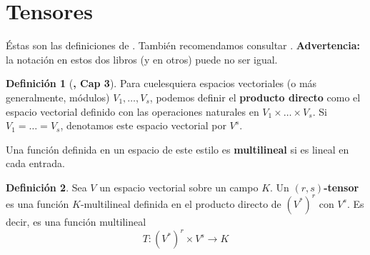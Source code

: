 \documentclass[spanish]{book}
\theoremstyle{definition}
\newtheorem*{defn}{Definición}
\begin{document}
	\section{Tensores}
	Éstas son las definiciones de \cite{ONeill}. También recomendamos consultar \cite{Palmas}. \textbf{Advertencia:} la notación en estos dos libros (y en otros) puede no ser igual.
	\begin{defn}[\cite{ONeill}\textbf{, Cap 3}]
		Para cuelesquiera espacios vectoriales (o más generalmente, módulos) $V_1,\ldots,V_s$, podemos definir el \textbf{producto directo} como el espacio vectorial definido con las operaciones naturales en $V_1\times\ldots\times V_s$. Si $V_1=\ldots=V_s$, denotamos este espacio vectorial por $V^s$.
		
		Una función definida en un espacio de este estilo es \textbf{multilineal} si es lineal en cada entrada.
	\end{defn}
	\begin{defn}
		Sea $V$ un espacio vectorial sobre un campo $K$. Un \textbf{$(r,s)$-tensor} es una función $K$-multilineal definida en el producto directo de $(V^*)^r$ con $V^s$. Es decir, es una función multilineal
		\[T:(V^*)^r\times V^s\to K\]
	\end{defn}
	
\end{document}
